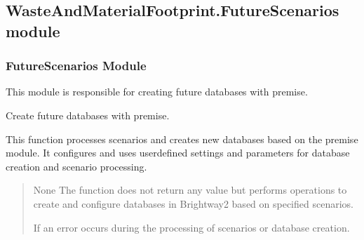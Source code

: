 \documentclass[letterpaper,10pt,english]{sphinxmanual}
\begin{document}
\subsection{WasteAndMaterialFootprint.FutureScenarios module}
\label{\detokenize{WasteAndMaterialFootprint:module-WasteAndMaterialFootprint.FutureScenarios}}\label{\detokenize{WasteAndMaterialFootprint:wasteandmaterialfootprint-futurescenarios-module}}

\subsubsection{FutureScenarios Module}
\label{\detokenize{WasteAndMaterialFootprint:futurescenarios-module}}
\sphinxAtStartPar
This module is responsible for creating future databases with premise.

\begin{fulllineitems}
\label{\detokenize{WasteAndMaterialFootprint:WasteAndMaterialFootprint.FutureScenarios.FutureScenarios}}
\pysigstartsignatures
{}
\pysigstopsignatures
\sphinxAtStartPar
Create future databases with premise.

\sphinxAtStartPar
This function processes scenarios and creates new databases based on the premise module. It configures and uses user\sphinxhyphen{}defined settings and parameters for database creation and scenario processing.
\begin{quote}\begin{description}
\sphinxAtStartPar
None
The function does not return any value but performs operations to create and configure databases in Brightway2 based on specified scenarios.

\sphinxAtStartPar
{} \textendash{} If an error occurs during the processing of scenarios or database creation.

\end{description}\end{quote}

\end{fulllineitems}
\end{document}
